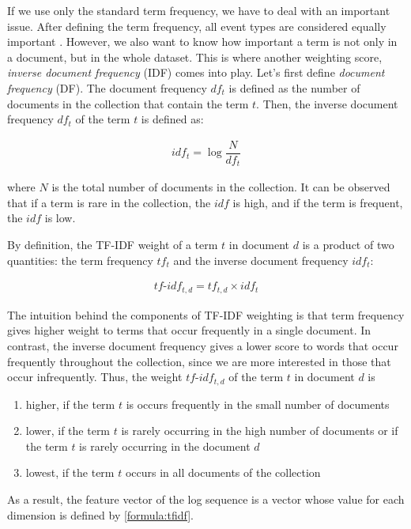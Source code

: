 If we use only the standard term frequency, we have to deal with an important issue. After defining the term frequency, all event types are considered equally important \cite{informationRetrieval2008}. However, we also want to know how important a term is not only in a document, but in the whole dataset. This is where another weighting score, \textit{inverse document frequency} (IDF) comes into play. Let's first define \textit{ document frequency} (DF). The document frequency $df_t$ is defined as the number of documents in the collection that contain the term $t$. Then, the inverse document frequency $df_t$ of the term $t$ is defined as: 


\begin{gather}
    idf_t = \log{\dfrac{N}{df_t}}
    \label{formula:idf}
\end{gather}

where $N$ is the total number of documents in the collection. It can be observed that if a term is rare in the collection, the $idf$ is high, and if the term is frequent, the $idf$ is low.

By definition, the TF-IDF weight of a term $t$ in document $d$ is a product of two quantities: the term frequency $tf_t$ and the inverse document frequency $idf_t$:

\begin{gather}
    tf\text{-}idf_{t, d} = tf_{t,d} \times idf_t
    \label{formula:tfidf}
\end{gather}

The intuition behind the components of TF-IDF weighting is that term frequency gives higher weight to terms that occur frequently in a single document. In contrast, the inverse document frequency gives a lower score to words that occur frequently throughout the collection, since we are more interested in those that occur infrequently. Thus, the weight $tf\text{-}idf_{t, d}$ of the term $t$ in document $d$ is 

\begin{enumerate}
    \item higher, if the term $t$ is occurs frequently in the small number of documents
    \item lower, if the term $t$ is rarely occurring in the high number of documents or if the term $t$ is rarely occurring in the document $d$
    \item lowest, if the term $t$ occurs in all documents of the collection
\end{enumerate}

As a result, the feature vector of the log sequence is a vector whose value for each dimension is defined by \ref{formula:tfidf}.

